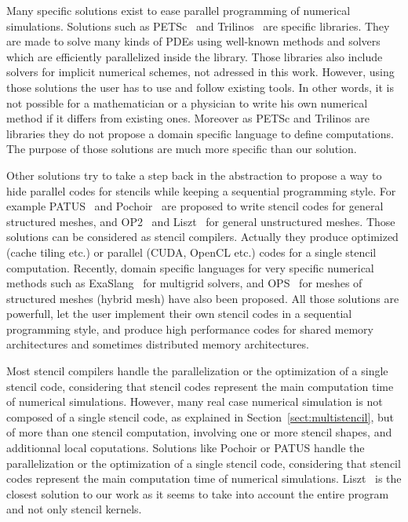 
Many specific solutions exist to ease parallel programming of numerical simulations. Solutions such as PETSc~\cite{petsc-efficient} and Trilinos~\cite{Trilinos-Overview} are specific libraries. They are made to solve many kinds of PDEs using well-known methods and solvers which are efficiently parallelized inside the library. Those libraries also include solvers for implicit numerical schemes, not adressed in this work. However, using those solutions the user has to use and follow existing tools. In other words, it is not possible for a mathematician or a physician to write his own numerical method if it differs from existing ones. Moreover as PETSc and Trilinos are libraries they do not propose a domain specific language to define computations. The purpose of those solutions are much more specific than our solution.

Other solutions try to take a step back in the abstraction to propose a way to hide parallel codes for stencils while keeping a sequential programming style. For example PATUS~\cite{citeulike12258902} and Pochoir~\cite{spaaTangCKLL11} are proposed to write stencil codes for general structured meshes, and OP2~\cite{Giles2011} and Liszt~\cite{DeVito2011LDS} for general unstructured meshes. Those solutions can be considered as stencil compilers. Actually they produce optimized (cache tiling etc.) or parallel (CUDA, OpenCL etc.) codes for a single stencil computation.
Recently, domain specific languages for very specific numerical methods such as ExaSlang~\cite{Schmitt:2014:EDL:2691166.2691171} for multigrid solvers, and OPS~\cite{Reguly:2014:ODS:2691166.2691173} for meshes of structured meshes (hybrid mesh) have also been proposed. 
All those solutions are powerfull, let the user implement their own stencil codes in a sequential programming style, and produce high performance codes for shared memory architectures and sometimes distributed memory architectures. 

Most stencil compilers handle the parallelization or the optimization of a single stencil code, considering that stencil codes represent the main computation time of numerical simulations. However, many real case numerical simulation is not composed of a single stencil code, as explained in Section~\ref{sect:multistencil}, but of more than one stencil computation, involving one or more stencil shapes, and additionnal local coputations. Solutions like Pochoir or PATUS handle the parallelization or the optimization of a single stencil code, considering that stencil codes represent the main computation time of numerical simulations. Liszt~\cite{DeVito2011LDS} is the closest solution to our work as it seems to take into account the entire program and not only stencil kernels. 

